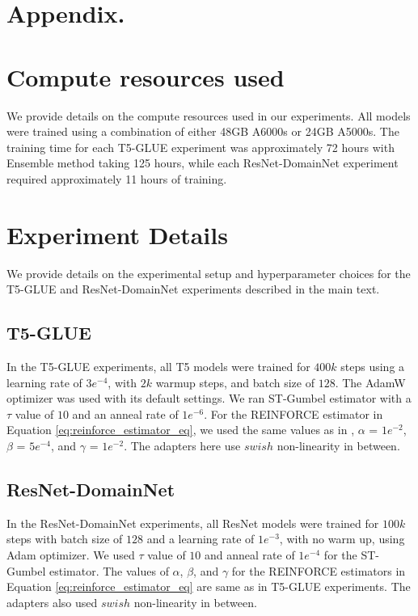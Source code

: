 \documentclass{article}
\theoremstyle{plain}
\theoremstyle{definition}
\theoremstyle{remark}
\begin{document}
\section{Appendix.}
\section{Compute resources used}
\label{sec:compute_resources}
We provide details on the compute resources used in our experiments. All models were trained using a combination of either 48GB A6000s or 24GB A5000s. 
The training time for each T5-GLUE experiment was approximately 72 hours with Ensemble method taking 125 hours, while each ResNet-DomainNet experiment required approximately 11 hours of training.  

\section{Experiment Details}
\label{sec:experiment_details}
We provide details on the experimental setup and hyperparameter choices for the T5-GLUE and ResNet-DomainNet experiments described in the main text. 
\subsection{T5-GLUE}
\label{sec:t5_glue_hyps}
In the T5-GLUE experiments, all T5 models were trained for $400k$ steps using a learning rate of $3e^{-4}$, with $2k$ warmup steps, and batch size of $128$. The AdamW optimizer was used with its default settings. 
We ran ST-Gumbel estimator with a $\tau$ value of $10$ and an anneal rate of $1e^{-6}$.
For the REINFORCE estimator in Equation \ref{eq:reinforce_estimator_eq}, we used the same values as in \citep{clark2022unified}, $\alpha$ = $1e^{-2}$, $\beta$ = $5e^{-4}$, and $\gamma$ = $1e^{-2}$.
The adapters here use $swish$ non-linearity in between. 

\subsection{ResNet-DomainNet}
\label{sec:res_domainnet_hyps}
In the ResNet-DomainNet experiments, all ResNet models were trained for $100k$ steps with batch size of $128$ and a learning rate of $1e^{-3}$, with no warm up, using Adam optimizer.
We used $\tau$ value of $10$ and anneal rate of $1e^{-4}$ for the ST-Gumbel estimator.
The values of $\alpha$, $\beta$, and $\gamma$ for the REINFORCE estimators in Equation \ref{eq:reinforce_estimator_eq} are same as in T5-GLUE experiments.
The adapters also used $swish$ non-linearity in between. 
\end{document}
